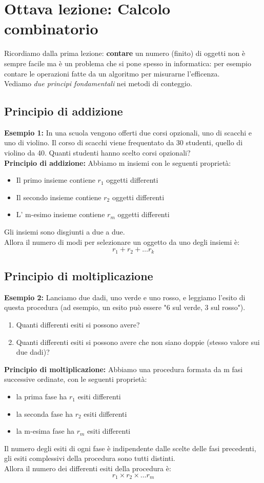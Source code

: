 \section{Ottava lezione: Calcolo combinatorio}
Ricordiamo dalla prima lezione: \textbf{contare} un numero (finito) di oggetti non è sempre facile ma è un
problema che si pone spesso in informatica: per esempio contare le operazioni fatte da un algoritmo per
misurarne l'efficenza. \\
Vediamo \emph{due principi fondamentali} nei metodi di conteggio. 

\subsection{Principio di addizione}
\textbf{Esempio 1:} In una scuola vengono offerti due corsi opzionali, uno di scacchi e uno di violino.
Il corso di scacchi viene frequentato da 30 studenti, quello di violino da 40.
Quanti studenti hanno scelto corsi opzionali? \\

\textbf{Principio di addizione:} Abbiamo m insiemi con le seguenti proprietà: 
\begin{itemize}
    \item Il primo insieme contiene $r_1$ oggetti differenti
    \item Il secondo insieme contiene $r_2$ oggetti differenti
    \item L' m-esimo insieme contiene $r_m$ oggetti differenti
\end{itemize}    
Gli insiemi sono disgiunti a due a due. \\
Allora il numero di modi per selezionare un oggetto da uno degli insiemi è: \[r_1 + r_2+ \dots  r_k \]

\subsection{Principio di moltiplicazione}
\textbf{Esempio 2:} Lanciamo due dadi, uno verde e uno rosso, e leggiamo l'esito di questa procedura
(ad esempio, un esito può essere "6 sul verde, 3 sul rosso").
\begin{enumerate}
    \item Quanti differenti esiti si possono avere?
    \item Quanti differenti esiti si possono avere che non siano doppie (stesso valore
    sui due dadi)?
\end{enumerate}
\textbf{Principio di moltiplicazione:} Abbiamo una procedura formata da m fasi successive ordinate,
con le seguenti proprietà:
\begin{itemize}
    \item la prima fase ha $r_1$ esiti differenti
    \item la seconda fase ha $r_2$ esiti differenti
    \item la m-esima fase ha $r_m$ esiti differenti
\end{itemize}
Il numero degli esiti di ogni fase è indipendente dalle scelte delle fasi precedenti, gli esiti complessivi della procedura sono tutti distinti. \\
Allora il numero dei differenti esiti della procedura è: \[ r_1  \times  r_2  \times \dots r_m\]

